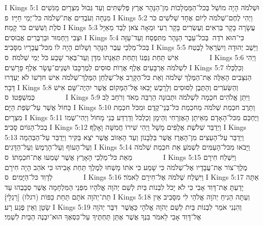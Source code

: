I Kings 5:1	וּשְׁלֹמֹה הָיָה מוֹשֵׁל בְּכל־הַמַּמְלָכוֹת מִן־הַנָּהָר אֶרֶץ פְּלִשְׁתִּים וְעַד גְּבוּל מִצְרָיִם מַגִּשִׁים מִנְחָה וְעֹבְדִים אֶת־שְׁלֹמֹה כּל־יְמֵי חַיָּיו׃ {פ}
I Kings 5:2	וַיְהִי לֶחֶם־שְׁלֹמֹה לְיוֹם אֶחָד שְׁלֹשִׁים כֹּר סֹלֶת וְשִׁשִּׁים כֹּר קָמַח׃
I Kings 5:3	עֲשָׂרָה בָקָר בְּרִאִים וְעֶשְׂרִים בָּקָר רְעִי וּמֵאָה צֹאן לְבַד מֵאַיָּל וּצְבִי וְיַחְמוּר וּבַרְבֻּרִים אֲבוּסִים׃
I Kings 5:4	כִּי־הוּא רֹדֶה  בְּכל־עֵבֶר הַנָּהָר מִתִּפְסַח וְעַד־עַזָּה בְּכל־מַלְכֵי עֵבֶר הַנָּהָר וְשָׁלוֹם הָיָה לוֹ מִכּל־עֲבָרָיו מִסָּבִיב׃
I Kings 5:5	וַיֵּשֶׁב יְהוּדָה וְיִשְׂרָאֵל לָבֶטַח אִישׁ תַּחַת גַּפְנוֹ וְתַחַת תְּאֵנָתוֹ מִדָּן וְעַד־בְּאֵר שָׁבַע כֹּל יְמֵי שְׁלֹמֹה׃ {ס}        
I Kings 5:6	וַיְהִי לִשְׁלֹמֹה אַרְבָּעִים אֶלֶף אֻרְוֺת סוּסִים לְמֶרְכָּבוֹ וּשְׁנֵים־עָשָׂר אֶלֶף פָּרָשִׁים׃
I Kings 5:7	וְכִלְכְּלוּ הַנִּצָּבִים הָאֵלֶּה אֶת־הַמֶּלֶךְ שְׁלֹמֹה וְאֵת כּל־הַקָּרֵב אֶל־שֻׁלְחַן הַמֶּלֶךְ־שְׁלֹמֹה אִישׁ חדְשׁוֹ לֹא יְעַדְּרוּ דָּבָר׃
I Kings 5:8	וְהַשְּׂעֹרִים וְהַתֶּבֶן לַסּוּסִים וְלָרָכֶשׁ יָבִאוּ אֶל־הַמָּקוֹם אֲשֶׁר יִהְיֶה־שָּׁם אִישׁ כְּמִשְׁפָּטוֹ׃ {ס}        
I Kings 5:9	וַיִּתֵּן אֱלֹהִים חכְמָה לִשְׁלֹמֹה וּתְבוּנָה הַרְבֵּה מְאֹד וְרֹחַב לֵב כַּחוֹל אֲשֶׁר עַל־שְׂפַת הַיָּם׃
I Kings 5:10	וַתֵּרֶב חכְמַת שְׁלֹמֹה מֵחכְמַת כּל־בְּנֵי־קֶדֶם וּמִכֹּל חכְמַת מִצְרָיִם׃
I Kings 5:11	וַיֶּחְכַּם מִכּל־הָאָדָם מֵאֵיתָן הָאֶזְרָחִי וְהֵימָן וְכַלְכֹּל וְדַרְדַּע בְּנֵי מָחוֹל וַיְהִי־שְׁמוֹ בְכל־הַגּוֹיִם סָבִיב׃
I Kings 5:12	וַיְדַבֵּר שְׁלֹשֶׁת אֲלָפִים מָשָׁל וַיְהִי שִׁירוֹ חֲמִשָּׁה וָאָלֶף׃
I Kings 5:13	וַיְדַבֵּר עַל־הָעֵצִים מִן־הָאֶרֶז אֲשֶׁר בַּלְּבָנוֹן וְעַד הָאֵזוֹב אֲשֶׁר יֹצֵא בַּקִּיר וַיְדַבֵּר עַל־הַבְּהֵמָה וְעַל־הָעוֹף וְעַל־הָרֶמֶשׂ וְעַל־הַדָּגִים׃
I Kings 5:14	וַיָּבֹאוּ מִכּל־הָעַמִּים לִשְׁמֹעַ אֵת חכְמַת שְׁלֹמֹה מֵאֵת כּל־מַלְכֵי הָאָרֶץ אֲשֶׁר שָׁמְעוּ אֶת־חכְמָתוֹ׃ {ס}        
I Kings 5:15	וַיִּשְׁלַח חִירָם מֶלֶךְ־צוֹר אֶת־עֲבָדָיו אֶל־שְׁלֹמֹה כִּי שָׁמַע כִּי אֹתוֹ מָשְׁחוּ לְמֶלֶךְ תַּחַת אָבִיהוּ כִּי אֹהֵב הָיָה חִירָם לְדָוִד כּל־הַיָּמִים׃ {ס}        
I Kings 5:16	וַיִּשְׁלַח שְׁלֹמֹה אֶל־חִירָם לֵאמֹר׃
I Kings 5:17	אַתָּה יָדַעְתָּ אֶת־דָּוִד אָבִי כִּי לֹא יָכֹל לִבְנוֹת בַּיִת לְשֵׁם יְהֹוָה אֱלֹהָיו מִפְּנֵי הַמִּלְחָמָה אֲשֶׁר סְבָבֻהוּ עַד תֵּת־יְהֹוָה אֹתָם תַּחַת כַּפּוֹת (רגלו) [רַגְלָי]׃
I Kings 5:18	וְעַתָּה הֵנִיחַ יְהֹוָה אֱלֹהַי לִי מִסָּבִיב אֵין שָׂטָן וְאֵין פֶּגַע רָע׃
I Kings 5:19	וְהִנְנִי אֹמֵר לִבְנוֹת בַּיִת לְשֵׁם יְהֹוָה אֱלֹהָי כַּאֲשֶׁר  דִּבֶּר יְהֹוָה אֶל־דָּוִד אָבִי לֵאמֹר בִּנְךָ אֲשֶׁר אֶתֵּן תַּחְתֶּיךָ עַל־כִּסְאֶךָ הוּא־יִבְנֶה הַבַּיִת לִשְׁמִי׃
